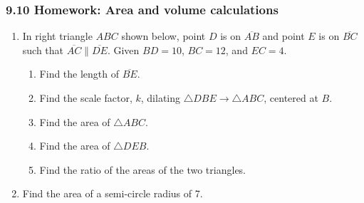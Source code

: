 \documentclass[12pt, twoside]{article}
\begin{document}
\subsubsection*{9.10 Homework: Area and volume calculations}
 \begin{enumerate}

   \item In right triangle $ABC$ shown below, point $D$ is on $\overline{AB}$ and point $E$ is on $\overline{BC}$ such that $\overline{AC} \parallel \overline{DE}$. Given $BD=10$, $BC=12$, and $EC=4$.
     \begin{center}
     \end{center}
    \begin{enumerate}
      \item Find the length of $\overline{BE}$. \vspace{0.5cm}
      \item Find the scale factor, $k$, dilating $\triangle DBE \rightarrow \triangle ABC$, centered at $B$. \vspace{1.5cm}
      \item Find the area of $\triangle ABC$. \vspace{2.5cm}
      \item Find the area of $\triangle DEB$. \vspace{2.5cm}
      \item Find the ratio of the areas of the two triangles. \vspace{2.5cm}

     \end{enumerate}


\newpage
\item Find the area of a semi-circle radius of 7. \vspace{2cm}


\end{enumerate}
\end{document}
